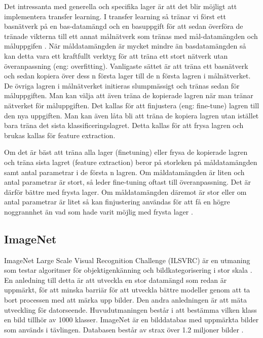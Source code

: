 \documentclass[]{kththesis}
\begin{document}
Det intressanta med generella och specifika lager är att det blir möjligt att implementera transfer learning. I transfer learning så tränar vi först ett basnätverk på en bas-datamängd och en basuppgift för att sedan överföra de tränade vikterna till ett annat målnätverk som tränas med mål-datamängden och måluppgifen \parencite{yosinski2014transferable}. När måldatamängden är mycket mindre än basdatamängden så kan detta vara ett kraftfullt verktyg för att träna ett stort nätverk utan överanpassning (eng: overfitting). Vanligaste sättet är att träna ett basnätverk och sedan kopiera över dess n första lager till de n första lagren i målnätverket. De övriga lagren i målnätverket initieras slumpmässigt och tränas sedan för måluppgiften. Man kan välja att även träna de kopierade lagren när man tränar nätverket för måluppgiften. Det kallas för att finjustera (eng: fine-tune) lagren till den nya uppgiften. Man kan även låta bli att träna de kopiera lagren utan istället bara träna det sista klassificeringslagret. Detta kallas för att frysa lagren och brukas kallas för feature extraction.

Om det är bäst att träna alla lager (finetuning) eller frysa de kopierade lagren och träna sista lagret (feature extraction) beror på storleken på måldatamängden samt antal parametrar i de första n lagren. Om måldatamängden är liten och antal parametrar är stort, så leder fine-tuning oftast till överanpassning. Det är därför bättre med frysta lager. Om måldatamängden däremot är stor eller om antal parametrar är litet så kan finjustering användas för att få en högre noggrannhet än vad som hade varit möjlig med frysta lager \parencite{yosinski2014transferable}. 

\subsection{ImageNet}
ImageNet Large Scale Visual Recognition Challenge (ILSVRC) är en utmaning som testar algoritmer för objektigenkänning och bildkategorisering i stor skala \parencite{ILSVRC15}. En anledning till detta är att utveckla en stor datamängd som redan är uppmärkt, för att minska barriär för att utveckla bättre modeller genom att ta bort processen med att märka upp bilder. Den andra anledningen är att mäta utveckling för datorseende. Huvudutmaningen består i att bestämma vilken klass en bild tillhör av 1000 klasser. ImageNet är en bilddatabas med uppmärkta bilder som används i tävlingen. Databasen består av strax över 1.2 miljoner bilder \parencite{huh2016makes}.
\end{document}
